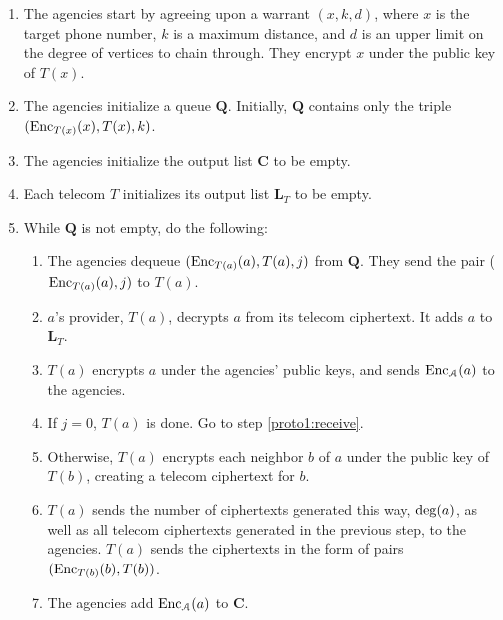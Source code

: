 \begin{enumerate}

\item The agencies start by agreeing upon a warrant $(x, k, d)$, where $x$ is the target phone number, $k$ is a maximum distance, and $d$ is an upper limit on the degree of vertices to chain through. They encrypt $x$ under the public key of $T(x)$.

\item The agencies initialize a queue $\mathbf{Q}$. Initially, $\mathbf{Q}$ contains only the triple $(\operatorname{Enc}_{T(x)}(x), T(x), k)$.

\item The agencies initialize the output list $\mathbf{C}$ to be empty.

\item Each telecom $T$ initializes its output list $\mathbf{L}_T$ to be empty.

\item While $\mathbf{Q}$ is not empty, do the following:

\begin{enumerate}

\item \label{proto1:top-of-loop} The agencies dequeue $(\operatorname{Enc}_{T(a)}(a), T(a), j)$ from $\mathbf{Q}$. They send the pair ($\operatorname{Enc}_{T(a)}(a), j)$ to $T(a)$.

\item $a$'s provider, $T(a)$, decrypts $a$ from its telecom ciphertext. It adds $a$ to $\mathbf{L}_T$.

\item \label{proto1:first-send} $T(a)$ encrypts $a$ under the agencies' public keys, and sends $\operatorname{Enc}_\mathcal{A}(a)$ to the agencies.

\item If $j=0$, $T(a)$ is done. Go to step \ref{proto1:receive}.

\item Otherwise, $T(a)$ encrypts each neighbor $b$ of $a$ under the public key of $T(b)$, creating a telecom ciphertext for $b$.

\item \label{proto1:second-send} $T(a)$ sends the number of ciphertexts generated this way, $\operatorname{deg}(a)$, as well as all telecom ciphertexts generated in the previous step, to the agencies. $T(a)$ sends the ciphertexts in the form of pairs $(\operatorname{Enc}_{T(b)}(b), T(b))$.

\item \label{proto1:receive} The agencies add $\operatorname{Enc}_\mathcal{A}(a)$ to $\mathbf{C}$.


\end{enumerate}
\end{enumerate}
